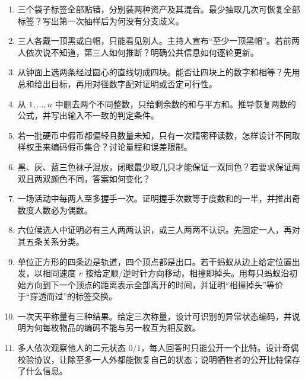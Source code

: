 \begin{enumerate}[leftmargin=*]
  \item {}三个袋子标签全部贴错，分别装两种资产及其混合。最少抽取几次可恢复全部标签？写出第一次抽样后为何没有分支歧义。
  \item {}三人各戴一顶黑或白帽，只能看见别人。主持人宣布“至少一顶黑帽”。若前两人依次说不知道，第三人如何推断？明确公共信息如何逐轮更新。
  \item {}从钟面上选两条经过圆心的直线切成四块。能否让四块上的数字和相等？先用总和给出目标，再用对径数字配对证明或否定可行性。
  \item {}从 $1,\ldots,n$ 中删去两个不同整数，只给剩余数的和与平方和。推导恢复两数的公式，并写出输入不一致的判定条件。
  \item {}若一批硬币中假币都偏轻且数量未知，只有一次精密秤读数，怎样设计不同取样权重来编码假币集合？讨论量程和误差限制。
  \item {}黑、灰、蓝三色袜子混放，闭眼最少取几只才能保证一双同色？若要求保证两双且两双颜色不同，答案如何变化？
  \item {}一场活动中每两人至多握手一次。证明握手次数等于度数和的一半，并推出奇数度人数必为偶数。
  \item {}六位候选人中证明必有三人两两认识，或三人两两不认识。先固定一人，再对其五条关系分类。
  \item {}单位正方形的四条边是轨道，四个顶点都是出口。若干蚂蚁从边上给定位置出发，以相同速度 $v$ 按给定顺/逆时针方向移动，相撞即掉头。用每只蚂蚁沿初始方向到下一个顶点的距离表示全部离开的时间，并证明“相撞掉头”等价于“穿透而过”的标签交换。
  \item {}一次天平称量有三种结果。给定三次称量，设计可识别的异常状态编码，并说明为何每枚物品的编码不能与另一枚互为相反数。
  \item {}多人依次观察他人的二元状态 $0/1$，每人回答时只能公开一个比特。设计奇偶校验协议，让除至多一人外都能恢复自己的状态；说明牺牲者的公开比特保存了什么信息。

\end{enumerate}

